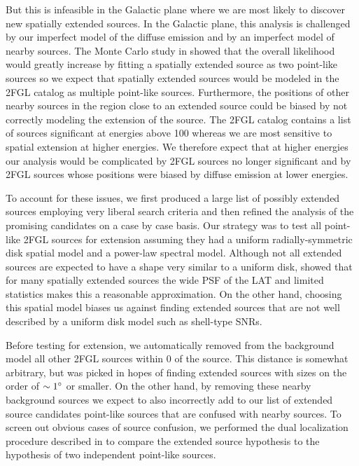But this is infeasible in the Galactic plane where we 
are most likely to discover new spatially extended sources.  In the Galactic plane,
this analysis is challenged by our imperfect model of the diffuse
emission and by an imperfect model of nearby sources.  The Monte Carlo
study in 
showed that the overall likelihood would greatly increase by fitting
a spatially extended source as two point-like sources so we expect
that spatially extended sources would be modeled in the 2FGL catalog as
multiple point-like sources. Furthermore, the positions of other nearby sources
in the region close to an extended source could be biased by not correctly
modeling the extension of the source.  The 2FGL catalog contains a
list of sources significant at energies above 100 \mev whereas we are
most sensitive to spatial extension at higher energies.
We therefore expect that at higher energies our analysis would be complicated
by 2FGL sources no longer significant and by 2FGL
sources whose positions were biased by diffuse emission at lower energies.

To account for these issues, we first produced a large list of possibly
extended sources employing very liberal search criteria and then
refined the analysis of the promising candidates on a case by case basis.
Our strategy was to test all point-like 2FGL sources for extension assuming
they had a uniform radially-symmetric disk spatial model
and a power-law spectral model.  Although not all extended sources are
expected to have a shape very similar to a uniform disk,  showed that for many spatially
extended sources the wide PSF of the LAT and limited statistics makes
this a reasonable approximation.  On the other hand, choosing this
spatial model biases us against finding extended sources that are not
well described by a uniform disk model such as shell-type SNRs.

Before testing for extension, we automatically removed from the background
model all other 2FGL sources within 0 of the source.  This distance
is somewhat arbitrary, but was picked in hopes of finding extended
sources with sizes on the order of $\sim1^\circ$ or smaller. On the
other hand, by removing these nearby background sources we expect to
also incorrectly add to our list of extended source candidates
point-like sources that
are confused with nearby sources.  To screen out obvious cases of source
confusion, we performed the dual localization procedure described in
 to compare the extended source
hypothesis to the hypothesis of two independent point-like sources.

